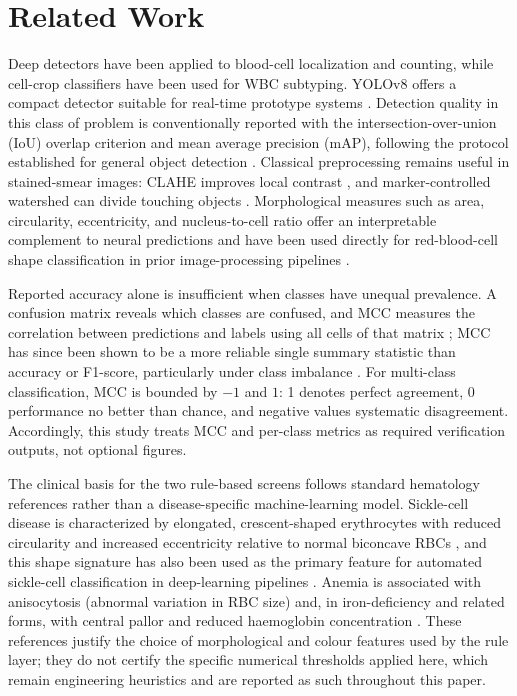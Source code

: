 \documentclass[conference]{IEEEtran}
\begin{document}
\section{Related Work}

Deep detectors have been applied to blood-cell localization and counting, while cell-crop classifiers have been used for WBC subtyping. YOLOv8 offers a compact detector suitable for real-time prototype systems \cite{ref_yolo}. Detection quality in this class of problem is conventionally reported with the intersection-over-union (IoU) overlap criterion and mean average precision (mAP), following the protocol established for general object detection \cite{ref_voc}. Classical preprocessing remains useful in stained-smear images: CLAHE improves local contrast \cite{ref_clahe}, and marker-controlled watershed can divide touching objects \cite{ref_watershed}. Morphological measures such as area, circularity, eccentricity, and nucleus-to-cell ratio offer an interpretable complement to neural predictions and have been used directly for red-blood-cell shape classification in prior image-processing pipelines \cite{ref_tomari}.

Reported accuracy alone is insufficient when classes have unequal prevalence. A confusion matrix reveals which classes are confused, and MCC measures the correlation between predictions and labels using all cells of that matrix \cite{ref_matthews}; MCC has since been shown to be a more reliable single summary statistic than accuracy or F1-score, particularly under class imbalance \cite{ref_chicco}. For multi-class classification, MCC is bounded by $-1$ and $1$: 1 denotes perfect agreement, 0 performance no better than chance, and negative values systematic disagreement. Accordingly, this study treats MCC and per-class metrics as required verification outputs, not optional figures.

The clinical basis for the two rule-based screens follows standard hematology references rather than a disease-specific machine-learning model. Sickle-cell disease is characterized by elongated, crescent-shaped erythrocytes with reduced circularity and increased eccentricity relative to normal biconcave RBCs \cite{ref_bain}, and this shape signature has also been used as the primary feature for automated sickle-cell classification in deep-learning pipelines \cite{ref_xu}. Anemia is associated with anisocytosis (abnormal variation in RBC size) and, in iron-deficiency and related forms, with central pallor and reduced haemoglobin concentration \cite{ref_bain,ref_who}. These references justify the choice of morphological and colour features used by the rule layer; they do not certify the specific numerical thresholds applied here, which remain engineering heuristics and are reported as such throughout this paper.
\end{document}
